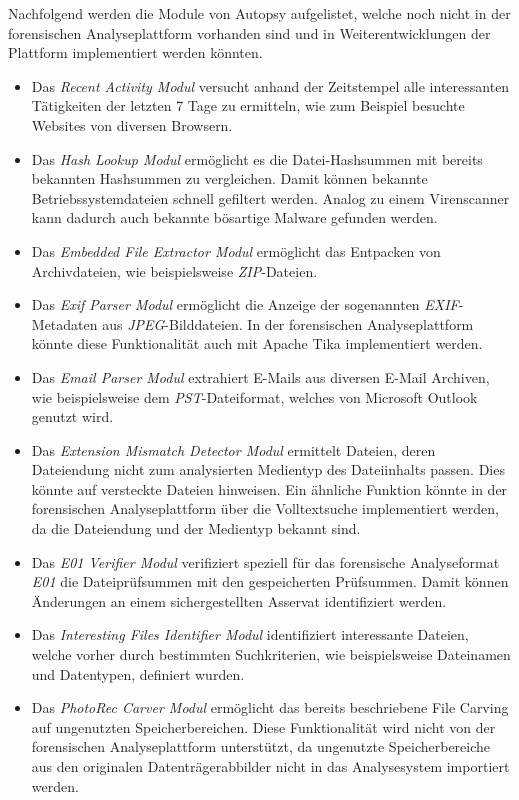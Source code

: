 \noindent
Nachfolgend werden die Module von Autopsy aufgelistet, welche noch nicht in der forensischen Analyseplattform vorhanden sind und in Weiterentwicklungen der Plattform implementiert werden könnten.
\begin{itemize}
\item Das \textit{Recent Activity Modul} versucht anhand der Zeitstempel alle interessanten Tätigkeiten der letzten 7 Tage zu ermitteln, wie zum Beispiel besuchte Websites von diversen Browsern.
\item Das \textit{Hash Lookup Modul} ermöglicht es die Datei-Hashsummen mit bereits bekannten Hashsummen zu vergleichen. Damit können bekannte Betriebssystemdateien schnell gefiltert werden. Analog zu einem Virenscanner kann dadurch auch bekannte bösartige Malware gefunden werden.
\item Das \textit{Embedded File Extractor Modul} ermöglicht das Entpacken von Archivdateien, wie beispielsweise \textit{ZIP}-Dateien.
\item Das \textit{Exif Parser Modul} ermöglicht die Anzeige der sogenannten \textit{EXIF}-Metadaten aus \textit{JPEG}-Bilddateien. In der forensischen Analyseplattform könnte diese Funktionalität auch mit Apache Tika implementiert werden.
\item Das \textit{Email Parser Modul} extrahiert E-Mails aus diversen E-Mail Archiven, wie beispielsweise dem \textit{PST}-Dateiformat, welches von Microsoft Outlook genutzt wird.
\item Das \textit{Extension Mismatch Detector Modul} ermittelt Dateien, deren Dateiendung nicht zum analysierten Medientyp des Dateiinhalts passen. Dies könnte auf versteckte Dateien hinweisen. Ein ähnliche Funktion könnte in der forensischen Analyseplattform über die Volltextsuche implementiert werden, da die Dateiendung und der Medientyp bekannt sind.
\item Das \textit{E01 Verifier Modul} verifiziert speziell für das forensische Analyseformat \textit{E01} die Dateiprüfsummen mit den gespeicherten Prüfsummen. Damit können Änderungen an einem sichergestellten Asservat identifiziert werden.
\item Das \textit{Interesting Files Identifier Modul} identifiziert interessante Dateien, welche vorher durch bestimmten Suchkriterien, wie beispielsweise Dateinamen und Datentypen, definiert wurden.
\item Das \textit{PhotoRec Carver Modul} ermöglicht das bereits beschriebene File Carving auf ungenutzten Speicherbereichen. Diese Funktionalität wird nicht von der forensischen Analyseplattform unterstützt, da ungenutzte Speicherbereiche aus den originalen Datenträgerabbilder nicht in das Analysesystem importiert werden.

\end{itemize}

